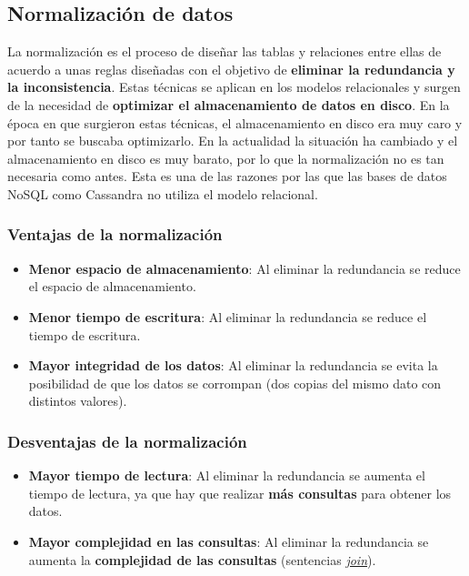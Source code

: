 \documentclass[
]{book}
\providecommand{\tightlist}{%
  \setlength{\itemsep}{0pt}\setlength{\parskip}{0pt}}
\begin{document}
\subsection{Normalización de datos}\label{normalizaciuxf3n-de-datos}

La normalización es el proceso de diseñar las tablas y relaciones entre ellas de acuerdo a unas reglas diseñadas con el objetivo de \textbf{eliminar la redundancia y la inconsistencia}. Estas técnicas se aplican en los modelos relacionales y surgen de la necesidad de \textbf{optimizar el almacenamiento de datos en disco}. En la época en que surgieron estas técnicas, el almacenamiento en disco era muy caro y por tanto se buscaba optimizarlo. En la actualidad la situación ha cambiado y el almacenamiento en disco es muy barato, por lo que la normalización no es tan necesaria como antes. Esta es una de las razones por las que las bases de datos NoSQL como Cassandra no utiliza el modelo relacional.

\subsubsection{Ventajas de la normalización}\label{ventajas-de-la-normalizaciuxf3n}

\begin{itemize}
\tightlist
\item
  \textbf{Menor espacio de almacenamiento}: Al eliminar la redundancia se reduce el espacio de almacenamiento.
\item
  \textbf{Menor tiempo de escritura}: Al eliminar la redundancia se reduce el tiempo de escritura.
\item
  \textbf{Mayor integridad de los datos}: Al eliminar la redundancia se evita la posibilidad de que los datos se corrompan (dos copias del mismo dato con distintos valores).
\end{itemize}

\subsubsection{Desventajas de la normalización}\label{desventajas-de-la-normalizaciuxf3n}

\begin{itemize}
\tightlist
\item
  \textbf{Mayor tiempo de lectura}: Al eliminar la redundancia se aumenta el tiempo de lectura, ya que hay que realizar \textbf{más consultas} para obtener los datos.
\item
  \textbf{Mayor complejidad en las consultas}: Al eliminar la redundancia se aumenta la \textbf{complejidad de las consultas} (sentencias \href{https://es.wikipedia.org/wiki/Sentencia_JOIN_en_SQL}{\emph{join}}).
\end{itemize}
\end{document}
